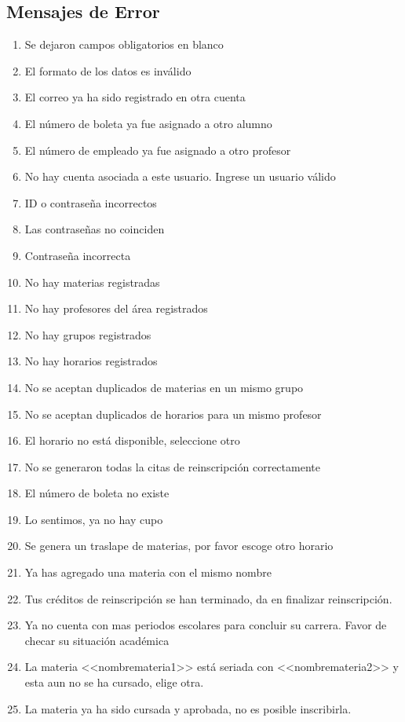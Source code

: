 \subsection*{Mensajes de Error}
\begin{enumerate}[{ME} 1.]
\item Se dejaron campos obligatorios en blanco
\item El formato de los datos es inválido
\item El correo ya ha sido registrado en otra cuenta
\item El número de boleta ya fue asignado a otro alumno
\item El número de empleado ya fue asignado a otro profesor
\item No hay cuenta asociada a este usuario. Ingrese un usuario válido
\item ID o contraseña incorrectos
\item Las contraseñas no coinciden
\item Contraseña incorrecta
\item No hay materias registradas
\item No hay profesores del área registrados
\item No hay grupos registrados
\item No hay horarios registrados
\item No se aceptan duplicados de materias en un mismo grupo
\item No se aceptan duplicados de horarios para un mismo profesor
\item El horario no está disponible, seleccione otro
\item No se generaron todas la citas de reinscripción correctamente
\item El número de boleta no existe
\item Lo sentimos, ya no hay cupo
\item Se genera un traslape de materias, por favor escoge otro horario
\item Ya has agregado una materia con el mismo nombre
\item Tus créditos de reinscripción se han terminado, da en finalizar reinscripción.
\item Ya no cuenta con mas periodos escolares para concluir su carrera. Favor de checar su situación académica
\item La materia <<nombremateria1>> está seriada con <<nombremateria2>> y esta aun no se ha cursado, elige otra.
\item La materia ya ha sido cursada y aprobada, no es posible inscribirla.

\end{enumerate}
